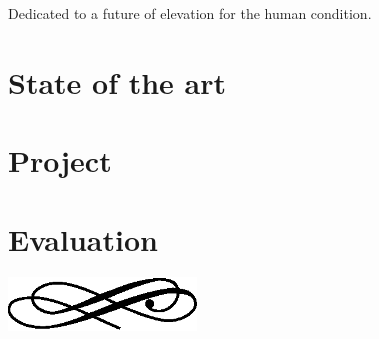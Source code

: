 



\frenchspacing
\raggedbottom
{}
\pagestyle{plain}

\cleardoublepage
\begin{center}
{\calligra
Dedicated to a future of elevation for the human condition.}
\end{center}
\cleardoublepage
\cleardoublepage\tableofcontents
\clearpage
\cleardoublepage
\newpage
{}
\pagestyle{scrheadings}
\sloppy

\part{State of the art}\label{prt:stateOfArt}

\part{Project}\label{prt:project}



\part{Evaluation}\label{prt:evaluation}




\begin{center}
  \includegraphics[width=5cm]{img/ornament.eps}  
\end{center}


\clearpage
\nocite{*}
{}



\printindex



